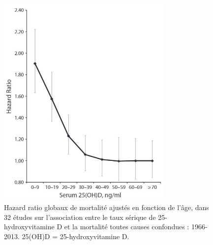 \documentclass[
  a4paper,
  DIV=11,
  numbers=noendperiod,
  listof=totoc]{scrreprt}
\begin{document}
\begin{figure}

{\centering \includegraphics[width=3.375in,height=\textheight]{figures/vd-hazard-ratio.jpg}

}

\caption{\label{fig-vd-hazard-ratio}Hazard ratio globaux de mortalité
ajustés en fonction de l'âge, dans 32 études sur l'association entre le
taux sérique de 25-hydroxyvitamine D et la mortalité toutes causes
confondues : 1966-2013. 25(OH)D = 25-hydroxyvitamine D.
\textcite{Garland.2014}}

\end{figure}
\end{document}
